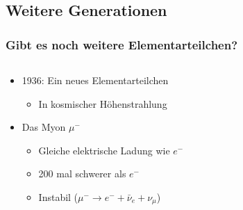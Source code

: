 \documentclass{beamer}
\begin{document}
\subsection{Weitere Generationen}
\begin{frame}
  \frametitle{Gibt es noch weitere Elementarteilchen?}
  \begin{columns}
    \begin{column}{0.6\textwidth}
      \begin{itemize}
      \item 1936: Ein neues Elementarteilchen
        \begin{itemize}
        \item In kosmischer H\"ohenstrahlung
        \end{itemize}
      \item Das Myon $\mu^{-}$
        \begin{itemize}
        \item Gleiche elektrische Ladung wie $e^{-}$
        \item 200 mal schwerer als $e^{-}$
        \item Instabil ($\mu^{-}\rightarrow e^{-} + \bar{\nu}_{e} + \nu_{\mu}$)
        \end{itemize}
      \end{itemize}
\end{column}
\end{columns}
\end{frame}
\end{document}
